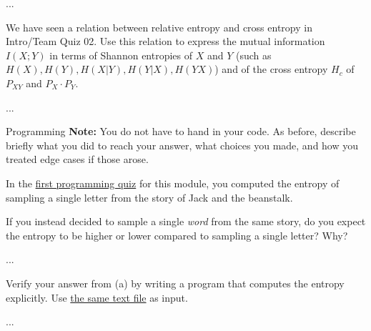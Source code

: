 \documentclass[a4paper,10pt]{article}
\begin{document}
\begin{solution}
...
\end{solution}

\begin{subproblem}{2}
We have seen a relation between relative entropy and cross
        entropy in Intro/Team Quiz 02. Use this relation to express
        the mutual information $I(X;Y)$ in terms of Shannon entropies
        of $X$ and $Y$ (such as $H(X), H(Y), H(X|Y), H(Y|X), H(YX)$) and of the cross entropy $H_c$ of $P_{XY}$ and $P_X
        \cdot P_Y$.
\end{subproblem}

\begin{solution}
...
\end{solution}









\begin{nproblem}{8}{Programming}
	\textbf{Note:} You do not have to hand in your code. As before, describe briefly what you did to reach your answer, what choices you made, and how you treated edge cases if those arose.
\end{nproblem}

\begin{subproblem}{1}
In the \href{https://canvas.uva.nl/courses/10933/assignments/72716}{first programming quiz} for this module, you computed the entropy of sampling a single letter from the story of Jack and the beanstalk.

If you instead decided to sample a single \emph{word} from the same story, do you expect the entropy to be higher or lower compared to sampling a single letter? Why?
\end{subproblem}

\begin{solution}
...
\end{solution}

\begin{subproblem}{3}
Verify your answer from (a) by writing a program that computes the entropy explicitly. Use \href{https://raw.githubusercontent.com/cschaffner/InformationTheory/master/2019/Text/Jack.txt}{the same text file} as input.
\end{subproblem}

\begin{solution}
...
\end{solution}
\end{document}
